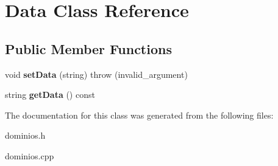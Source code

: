 \hypertarget{classData}{}\section{Data Class Reference}
\label{classData}
\subsection*{Public Member Functions}
\begin{DoxyCompactItemize}
\item 
\mbox{\label{classData_a75a50f88bc966f20826a3959717a5acc}} 
void {\bfseries set\+Data} (string)  throw (invalid\+\_\+argument)
\item 
\mbox{\label{classData_a13f25eafdc138d743e99eb4086d765a2}} 
string {\bfseries get\+Data} () const
\end{DoxyCompactItemize}


The documentation for this class was generated from the following files\+:\begin{DoxyCompactItemize}
\item 
dominios.\+h\item 
dominios.\+cpp\end{DoxyCompactItemize}
